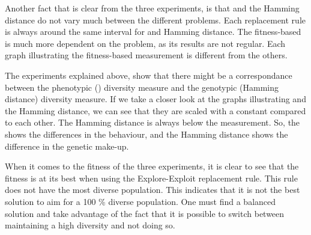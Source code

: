 Another fact that is clear from the three experiments, is that \dia{} and the Hamming distance do not vary much between the different problems. Each replacement rule is always around the same interval for \dia{} and Hamming distance. The fitness-based is much more dependent on the problem, as its results are not regular. Each graph illustrating the fitness-based measurement is different from the others.

The experiments explained above, show that there might be a correspondance between the phenotypic (\dia{}) diversity measure and the genotypic (Hamming distance) diversity measure. If we take a closer look at the graphs illustrating \dia{} and the Hamming distance, we can see that they are scaled with a constant compared to each other. The Hamming distance is always below the \dia{} measurement. So, the \dia{} shows the differences in the behaviour, and the Hamming distance shows the difference in the genetic make-up.  

When it comes to the fitness of the three experiments, it is clear to see that the fitness is at its best when using the Explore-Exploit replacement rule. This rule does not have the most diverse population. This indicates that it is not the best solution to aim for a 100 \% diverse population. One must find a balanced solution and take advantage of the fact that it is possible to switch between maintaining a high diversity and not doing so.

